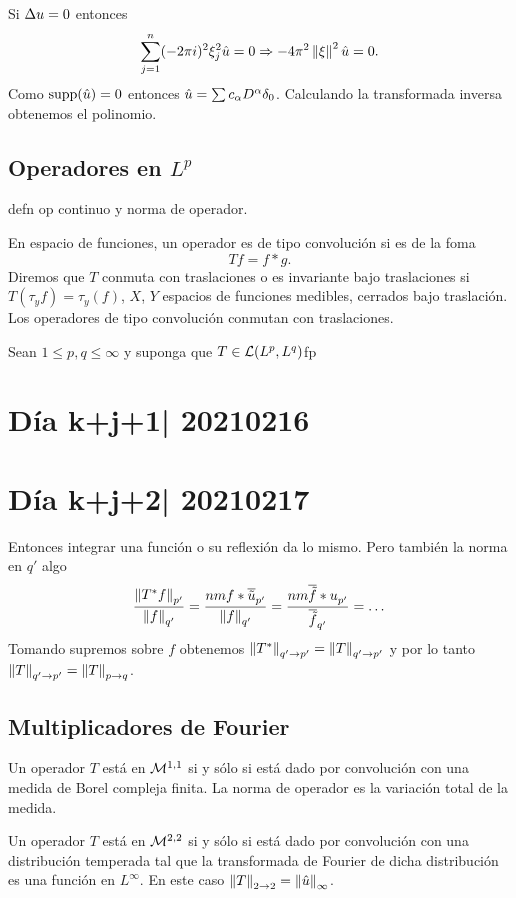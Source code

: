 \documentclass[12pt]{memoir}
\begin{document}
\begin{ptcbp}
  Si $\Delta u=0$ entonces 
  $$\sum_{j=1}^n(-2\pi i)^2\xi_j^2\hat{u}=0\Rightarrow -4\pi^2\left\|\xi\right\|^2\hat{u}=0.$$
  Como $\operatorname{supp}(\hat{u})=0$ entonces $\hat{u}=\sum c_\alpha D^\alpha \delta_0$. Calculando la transformada inversa obtenemos el polinomio.
\end{ptcbp}

\subsection{Operadores en $L^p$}

defn op continuo y norma de operador.\par 
En espacio de funciones, un operador es de tipo convolución si es de la foma $$Tf = f\ast g.$$
Diremos que $T$ conmuta con traslaciones o es invariante bajo traslaciones si $T(\tau_yf)=\tau_y(f)$, $X$, $Y$ espacios de funciones medibles, cerrados bajo traslación. Los operadores de tipo convolución conmutan con traslaciones.

\begin{Th}
  Sean $1\leq p,q\leq \infty$ y suponga que $T\in\mathcal{L}(L^p,L^q)$fp
\end{Th}

\section{Día k+j+1| 20210216}
\section{Día k+j+2| 20210217}

Entonces integrar una función o su reflexión da lo mismo. Pero también la norma en $q'$ algo
$$\frac{\left\|T^\ast f\right\|_{p'}}{\left\|f\right\|_{q'}}=\frac{nm{f\ast\overline{\tilde{u}}}_{p'}}{\left\|f\right\|_{q'}}=\frac{nm{\overline{\tilde{f}}\ast u}_{p'}}{\overline{\tilde{f}}_{q'}}=\dots$$
Tomando supremos sobre $f$ obtenemos $\left\|T^\ast\right\|_{q'\to p'}=\left\|T\right\|_{q'\to p'}$ y por lo tanto $\left\|T\right\|_{q'\to p'}=\left\|T\right\|_{p\to q}$.

\subsection{Multiplicadores de Fourier}

\begin{Th}
  Un operador $T$ está en $\mathcal{M}^{1,1}$ si y sólo si está dado por convolución con una medida de Borel compleja finita. La norma de operador es la variación total de la medida.
\end{Th}

\begin{Th}
  Un operador $T$ está en $\mathcal{M}^{2,2}$ si y sólo si está dado por convolución con una distribución temperada tal que la transformada de Fourier de dicha distribución es una función en $L^\infty$. En este caso $\left\|T\right\|_{2\to 2}=\left\|\hat{u}\right\|_{\infty}$.
\end{Th}


\ifx\nextra\undefined
\printindex
\else\fi
\nocite{*}


\end{document}
